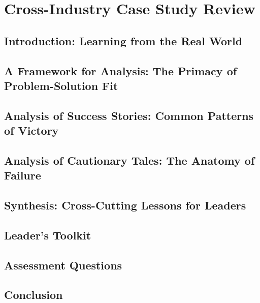 \chapter{Cross-Industry Case Study Review}
\label{chap:cross_industry_case_study_review}

\section{Introduction: Learning from the Real World}
\label{sec:case_study_introduction}

\section{A Framework for Analysis: The Primacy of Problem-Solution Fit}
\label{sec:framework_for_analysis}

\section{Analysis of Success Stories: Common Patterns of Victory}
\label{sec:success_stories}

\section{Analysis of Cautionary Tales: The Anatomy of Failure}
\label{sec:cautionary_tales}

\section{Synthesis: Cross-Cutting Lessons for Leaders}
\label{sec:synthesis}

\section{Leader's Toolkit}
\label{sec:case_study_leaders_toolkit}

\section{Assessment Questions}
\label{sec:case_study_assessment_questions}

\section{Conclusion}
\label{sec:case_study_conclusion}